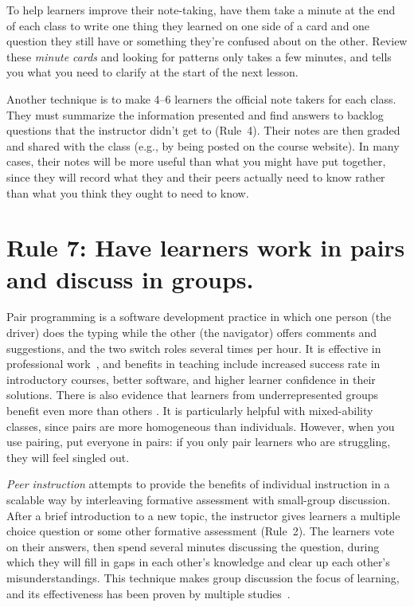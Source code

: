 \documentclass[10pt,letterpaper]{article}
\newcommand{\rulemajor}[1]{\section{#1}}
\begin{document}
To help learners improve their note-taking,
have them take a minute at the end of each class
to write one thing they learned on one side of a card
and one question they still have or something they're confused about on the other.
Review these \emph{minute cards} and looking for patterns only takes a few minutes,
and tells you what you need to clarify at the start of the next lesson.

Another technique is to make 4--6 learners the official note takers for each class.
They must summarize the information presented
and find answers to backlog questions that the instructor didn't get to (Rule~4).
Their notes are then graded and shared with the class
(e.g., by being posted on the course website).
In many cases,
their notes will be more useful than what you might have put together,
since they will record what they and their peers actually need to know
rather than what you think they ought to need to know.

\rulemajor{Rule 7: Have learners work in pairs and discuss in groups.}

Pair programming is a software development practice
in which one person (the driver) does the typing
while the other (the navigator) offers comments and suggestions,
and the two switch roles several times per hour.
It is effective in professional work~\cite{Hann2009},
and benefits in teaching include increased success rate in introductory courses,
better software,
and higher learner confidence in their solutions.
There is also evidence that learners from underrepresented groups
benefit even more than others \cite{McDo2006,Hank2011,Cele2018}.
It is particularly helpful with mixed-ability classes,
since pairs are more homogeneous than individuals.
However,
when you use pairing,
put everyone in pairs:
if you only pair learners who are struggling,
they will feel singled out.

\emph{Peer instruction} attempts to provide the benefits of individual instruction in a scalable way
by interleaving formative assessment with small-group discussion.
After a brief introduction to a new topic,
the instructor gives learners a multiple choice question or some other formative assessment
(Rule~2).
The learners vote on their answers,
then spend several minutes discussing the question,
during which they will fill in gaps in each other's knowledge
and clear up each other's misunderstandings.
This technique makes group discussion the focus of learning,
and its effectiveness has been proven by multiple studies~\cite{Crou2001,Smit2009,Port2016}.
\end{document}
